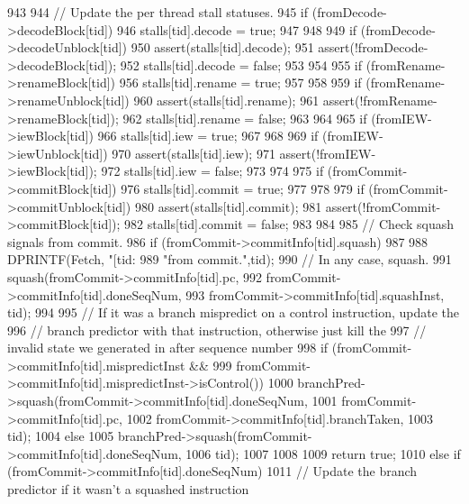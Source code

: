 \begin{DoxyCode}
943 {
944     // Update the per thread stall statuses.
945     if (fromDecode->decodeBlock[tid]) {
946         stalls[tid].decode = true;
947     }
948 
949     if (fromDecode->decodeUnblock[tid]) {
950         assert(stalls[tid].decode);
951         assert(!fromDecode->decodeBlock[tid]);
952         stalls[tid].decode = false;
953     }
954 
955     if (fromRename->renameBlock[tid]) {
956         stalls[tid].rename = true;
957     }
958 
959     if (fromRename->renameUnblock[tid]) {
960         assert(stalls[tid].rename);
961         assert(!fromRename->renameBlock[tid]);
962         stalls[tid].rename = false;
963     }
964 
965     if (fromIEW->iewBlock[tid]) {
966         stalls[tid].iew = true;
967     }
968 
969     if (fromIEW->iewUnblock[tid]) {
970         assert(stalls[tid].iew);
971         assert(!fromIEW->iewBlock[tid]);
972         stalls[tid].iew = false;
973     }
974 
975     if (fromCommit->commitBlock[tid]) {
976         stalls[tid].commit = true;
977     }
978 
979     if (fromCommit->commitUnblock[tid]) {
980         assert(stalls[tid].commit);
981         assert(!fromCommit->commitBlock[tid]);
982         stalls[tid].commit = false;
983     }
984 
985     // Check squash signals from commit.
986     if (fromCommit->commitInfo[tid].squash) {
987 
988         DPRINTF(Fetch, "[tid:%
989                 "from commit.\n",tid);
990         // In any case, squash.
991         squash(fromCommit->commitInfo[tid].pc,
992                fromCommit->commitInfo[tid].doneSeqNum,
993                fromCommit->commitInfo[tid].squashInst, tid);
994 
995         // If it was a branch mispredict on a control instruction, update the
996         // branch predictor with that instruction, otherwise just kill the
997         // invalid state we generated in after sequence number
998         if (fromCommit->commitInfo[tid].mispredictInst &&
999             fromCommit->commitInfo[tid].mispredictInst->isControl()) {
1000             branchPred->squash(fromCommit->commitInfo[tid].doneSeqNum,
1001                               fromCommit->commitInfo[tid].pc,
1002                               fromCommit->commitInfo[tid].branchTaken,
1003                               tid);
1004         } else {
1005             branchPred->squash(fromCommit->commitInfo[tid].doneSeqNum,
1006                               tid);
1007         }
1008 
1009         return true;
1010     } else if (fromCommit->commitInfo[tid].doneSeqNum) {
1011         // Update the branch predictor if it wasn't a squashed instruction
}}
\end{DoxyCode}
